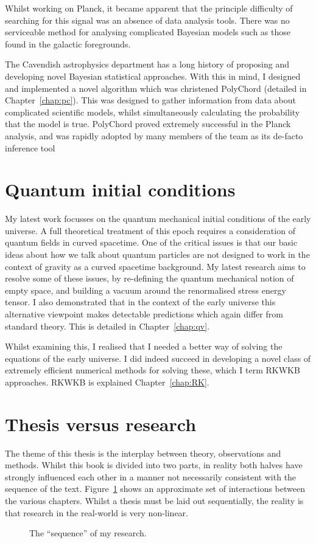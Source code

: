 Whilst working on Planck, it became apparent that the principle difficulty of searching for this signal was an absence of data analysis tools. There was no serviceable method for analysing complicated Bayesian models such as those found in the galactic foregrounds.

The Cavendish astrophysics department has a long history of proposing and developing novel Bayesian statistical approaches. With this in mind, I designed and implemented a novel algorithm which was christened PolyChord (detailed in Chapter~\ref{chap:pc}). This was designed to gather information from data about complicated scientific models, whilst simultaneously calculating the probability that the model is true. PolyChord proved extremely successful in the Planck analysis, and was rapidly adopted by many members of the team as its de-facto inference tool

\section{Quantum initial conditions}
My latest work focusses on the quantum mechanical initial conditions of the early universe. A full theoretical treatment of this epoch requires a consideration of quantum fields in curved spacetime. One of the critical issues is that our basic ideas about how we talk about quantum particles are not designed to work in the context of gravity as a curved spacetime background. My latest research aims to resolve some of these issues, by re-defining the quantum mechanical notion of empty space, and building a vacuum around the renormalised stress energy tensor. I also demonstrated that in the context of the early universe this alternative viewpoint makes detectable predictions which again differ from standard theory. This is detailed in Chapter~\ref{chap:qv}.

Whilst examining this, I realised that I needed a better way of solving the equations of the early universe. I did indeed succeed in developing a novel class of extremely efficient numerical methods for solving these, which I term RKWKB approaches. RKWKB is explained Chapter~\ref{chap:RK}.

\section{Thesis versus research}

The theme of this thesis is the interplay between theory, observations and methods. Whilst this book is divided into two parts, in reality both halves have strongly influenced each other in a manner not necessarily consistent with the sequence of the text. Figure~\ref{fig:out:sequence} shows an approximate set of interactions between the various chapters. Whilst a thesis must be laid out sequentially, the reality is that research in the real-world is very non-linear.

\begin{figure}[tp]
  
  \caption{The ``sequence'' of my research.}\label{fig:out:sequence}
\end{figure}





